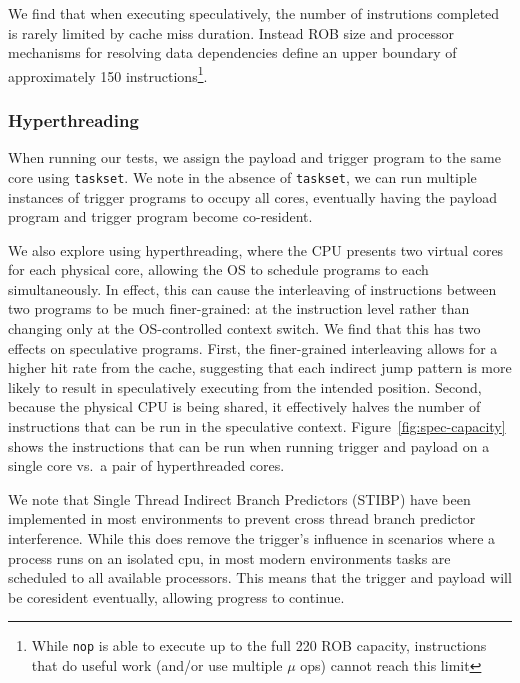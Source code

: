 \medskip

We find that when executing speculatively, the number of instrutions completed
is rarely limited by cache miss duration. Instead
ROB size and processor mechanisms for resolving
data dependencies define an upper boundary of approximately 150
instructions\footnote{While \texttt{nop} is able to execute up to the full 220
ROB capacity, instructions that do useful work (and/or use multiple $\mu$ ops) cannot reach this limit}.



\subsubsection{Hyperthreading}
\label{sssec:hyperthread}

When running our tests, we assign the payload and trigger program to the same
core using \texttt{taskset}. We note in the absence of \texttt{taskset}, we can
run multiple instances of trigger programs to occupy all cores, eventually
having the payload program and trigger program become co-resident.

We also explore using hyperthreading, where the CPU presents two virtual cores
for each physical core, allowing the OS to schedule programs to each
simultaneously. In effect, this can cause the interleaving of instructions
between two programs to be much finer-grained: at the instruction level rather
than changing only at the OS-controlled context switch. We find that this
has two effects on speculative programs. First, the finer-grained interleaving
allows for a higher hit rate from the cache, suggesting that each indirect jump
pattern is more likely to result in speculatively executing from the intended
position. %
Second, because the physical CPU is being shared, it effectively halves the
number of instructions that can be run in the speculative context.
Figure~\ref{fig:spec-capacity} shows the instructions that can be run when
running trigger and payload on a single core vs.\ a pair of hyperthreaded cores.

We note that Single Thread Indirect Branch Predictors (STIBP) have been implemented
in most environments to prevent cross thread branch predictor interference.
While this does remove the \speculake trigger's influence in scenarios where a
process runs on an isolated cpu, in most modern environments
tasks are scheduled to all available processors. This means that the trigger and
payload will be coresident eventually, allowing progress to continue.


